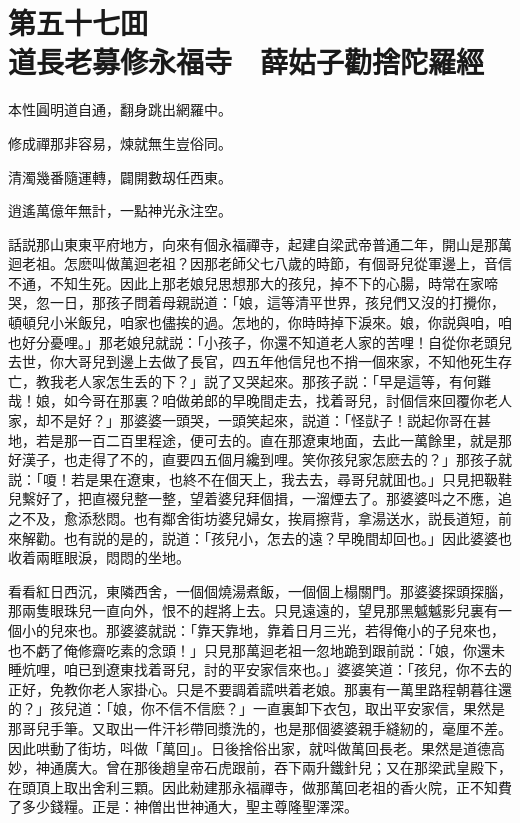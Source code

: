 
\chapter*{第五十七囬　\\道長老募修永福寺　薛姑子勸捨陀羅經}


\begin{myquote}
本性圓明道自通，翻身跳出網羅中。

修成禪那非容易，煉就無生豈俗同。

清濁幾番隨運轉，闢開數刼任西東。

逍遙萬億年無計，一點神光永注空。
\end{myquote}

話説那山東東平府地方，向來有個永福禪寺，起建自梁武帝普通二年，開山是那萬迴老祖。怎麽叫做萬迴老祖？因那老師父七八歲的時節，有個哥兒從軍邊上，音信不通，不知生死。因此上那老娘兒思想那大的孩兒，掉不下的心腸，時常在家啼哭，忽一日，那孩子問着母親説道：「娘，這等清平世界，孩兒們又沒的打攪你，頓頓兒小米飯兒，咱家也儘挨的過。怎地的，你時時掉下淚來。娘，你説與咱，咱也好分憂哩。」那老娘兒就説：「小孩子，你還不知道老人家的苦哩！自從你老頭兒去世，你大哥兒到邊上去做了長官，四五年他信兒也不捎一個來家，不知他死生存亡，教我老人家怎生丢的下？」説了又哭起來。那孩子説：「早是這等，有何難哉！娘，如今哥在那裏？咱做弟郎的早晚間走去，找着哥兒，討個信來回覆你老人家，却不是好？」那婆婆一頭哭，一頭笑起來，説道：「怪獃子！説起你哥在甚地，若是那一百二百里程途，便可去的。直在那遼東地面，去此一萬餘里，就是那好漢子，也走得了不的，直要四五個月纔到哩。笑你孩兒家怎麽去的？」那孩子就説：「嗄！若是果在遼東，也終不在個天上，我去去，尋哥兒就囬也。」只見把靸鞋兒繫好了，把直裰兒整一整，望着婆兒拜個揖，一溜煙去了。那婆婆呌之不應，追之不及，愈添愁悶。也有鄰舍街坊婆兒婦女，挨肩擦背，拿湯送水，説長道短，前來解勸。也有説的是的，説道：「孩兒小，怎去的遠？早晚間却回也。」因此婆婆也收着兩眶眼淚，悶悶的坐地。

看看紅日西沉，東隣西舍，一個個燒湯煮飯，一個個上榻關門。那婆婆探頭探腦，那兩隻眼珠兒一直向外，恨不的趕將上去。只見遠遠的，望見那黑魆魆影兒裏有一個小的兒來也。那婆婆就説：「靠天靠地，靠着日月三光，若得俺小的子兒來也，也不虧了俺修齋吃素的念頭！」只見那萬迴老祖一忽地跪到跟前説：「娘，你還未睡炕哩，咱已到遼東找着哥兒，討的平安家信來也。」婆婆笑道：「孩兒，你不去的正好，免教你老人家掛心。只是不要調着謊哄着老娘。那裏有一萬里路程朝暮往還的？」孩兒道：「娘，你不信不信麽？」一直裏卸下衣包，取出平安家信，果然是那哥兒手筆。又取出一件汗衫帶囘漿洗的，也是那個婆婆親手縫紉的，毫厘不差。因此哄動了街坊，呌做「萬回」。日後捨俗出家，就呌做萬回長老。果然是道德高妙，神通廣大。曾在那後趙皇帝石虎跟前，吞下兩升鐵針兒；又在那梁武皇殿下，在頭頂上取出舍利三顆。因此勑建那永福禪寺，做那萬回老祖的香火院，正不知費了多少錢糧。正是：神僧出世神通大，聖主尊隆聖澤深。

